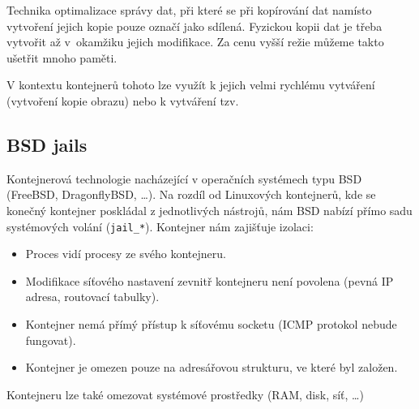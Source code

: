 Technika optimalizace správy dat, při které se při kopírování dat namísto vytvoření jejich kopie pouze označí jako sdílená.
Fyzickou kopii dat je třeba vytvořit až v~okamžiku jejich modifikace.
Za cenu vyšší režie můžeme takto ušetřit mnoho paměti.
\cite{copy_on_write}

V kontextu kontejnerů tohoto lze využít k jejich velmi rychlému vytváření (vytvoření kopie obrazu) nebo k vytváření tzv. 
\cite{fs_cow}

\subsection{BSD jails}

Kontejnerová technologie nacházející v operačních systémech typu BSD (FreeBSD, DragonflyBSD, \ldots).
Na rozdíl od Linuxových kontejnerů, kde se konečný kontejner poskládal z jednotlivých nástrojů, nám BSD nabízí přímo sadu systémových volání (\verb|jail_*|).
Kontejner nám zajišťuje izolaci:

\begin{itemize}
	\item Proces vidí procesy ze svého kontejneru.
	\item Modifikace síťového nastavení zevnitř kontejneru není povolena (pevná IP adresa, routovací tabulky).
	\item Kontejner nemá přímý přístup k síťovému socketu (ICMP protokol nebude fungovat).
	\item Kontejner je omezen pouze na adresářovou strukturu, ve které byl založen.
\end{itemize}

Kontejneru lze také omezovat systémové prostředky (RAM, disk, síť, \ldots)


